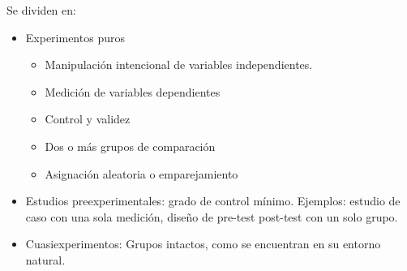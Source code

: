 \documentclass[a4paper,12pt]{article}
\begin{document}
\begin{itemize}
        Se dividen en:
        \begin{itemize}
            \item Experimentos puros
            \begin{itemize}
                \item Manipulación intencional de variables independientes.
                \item Medición de variables dependientes
                \item Control y validez
                \item Dos o más grupos de comparación
                \item Asignación aleatoria o emparejamiento
            \end{itemize}
            \item Estudios preexperimentales: grado de control mínimo. Ejemplos: estudio de caso con una sola medición, diseño de pre-test post-test con un solo grupo.
            \item Cuasiexperimentos: Grupos intactos, como se encuentran en su entorno natural.
        \end{itemize}
\end{itemize}
\end{document}
